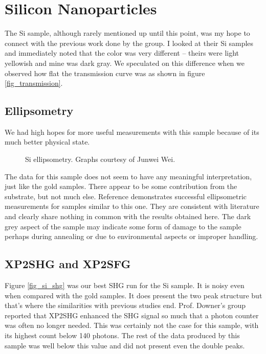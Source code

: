 \section{Silicon Nanoparticles}
The Si sample, although rarely mentioned up until this point, was my hope to connect with the previous work done by the group. I looked at their Si samples and immediately noted that the color was very different -- theirs were light yellowish and mine was dark gray. We speculated on this difference when we observed how flat the transmission curve was as shown in figure \ref{fig_transmission}.

\subsection{Ellipsometry}
We had high hopes for more useful measurements with this sample because of its much better physical state.

\begin{figure}[h]
  \centering
  \caption[Si ellipsometry.]{Si ellipsometry. Graphs courtesy of Junwei Wei.\label{fig_si_ellip}}
\end{figure}

The data for this sample does not seem to have any meaningful interpretation, just like the gold samples. There appear to be some contribution from the substrate, but not much else.  Reference \cite{PhysRevB.84.165316} demonstrates successful ellipsometric measurements for samples similar to this one. They are consistent with literature and clearly share nothing in common with the results obtained here. The dark grey aspect of the sample may indicate some form of damage to the sample perhaps during annealing or due to environmental aspects or improper handling.

\subsection{XP2SHG and XP2SFG}
Figure \ref{fig_si_shg} was our best SHG run for the Si sample. It is noisy even when compared with the gold samples. It does present the two peak structure but that's where the similarities with previous studies end. Prof. Downer's group reported that XP2SHG enhanced the SHG signal so much that a photon counter was often no longer needed. This was certainly not the case for this sample, with its highest count below 140 photons. The rest of the data produced by this sample was well below this value and did not present even the double peaks.

